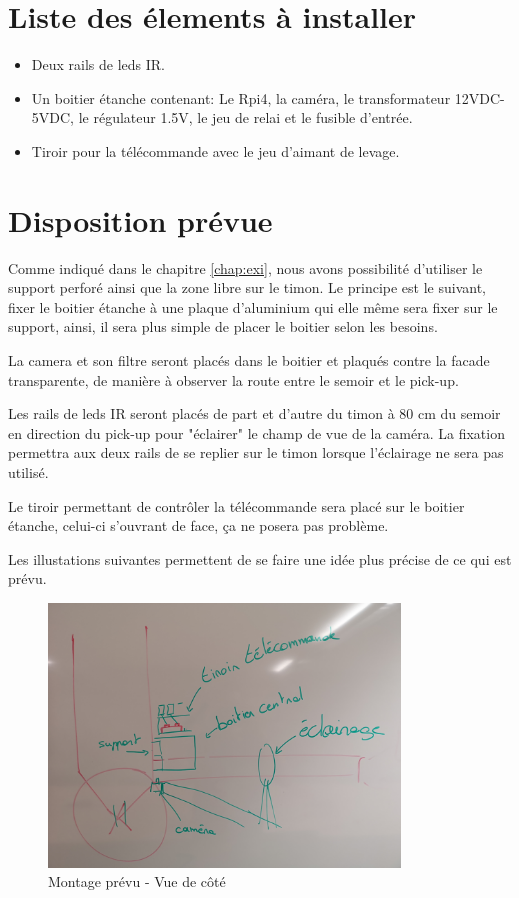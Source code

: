 \section{Liste des élements à installer}
\begin{itemize}
    \item Deux rails de leds IR.
    \item Un boitier étanche contenant: Le Rpi4, la caméra, le transformateur 12VDC-5VDC, le régulateur 1.5V, le jeu de relai et le fusible d'entrée.
    \item Tiroir pour la télécommande avec le jeu d'aimant de levage.
\end{itemize}
\section{Disposition prévue}
Comme indiqué dans le chapitre \ref{chap:exi}, nous avons possibilité d'utiliser le support perforé ainsi que la zone libre sur le timon.
Le principe est le suivant, fixer le boitier étanche à une plaque d'aluminium qui elle même sera fixer sur le support, ainsi, il sera plus simple
de placer le boitier selon les besoins.

La camera et son filtre seront placés dans le boitier et plaqués contre la facade transparente, de manière à observer la route entre le semoir
et le pick-up.

Les rails de leds IR seront placés de part et d'autre du timon à 80 \si{\centi\metre} du semoir en direction du pick-up pour "éclairer" le champ
de vue de la caméra. La fixation permettra aux deux rails de se replier sur le timon lorsque l'éclairage ne sera pas utilisé.

Le tiroir permettant de contrôler la télécommande sera placé sur le boitier étanche, celui-ci s'ouvrant de face, ça ne posera pas problème.

Les illustations suivantes permettent de se faire une idée plus précise de ce qui est prévu.

\begin{figure}[H]
    \centering
    \includegraphics[height=7cm]{assets/figures/montage1.jpg}
    \caption{Montage prévu - Vue de côté}
\end{figure}

